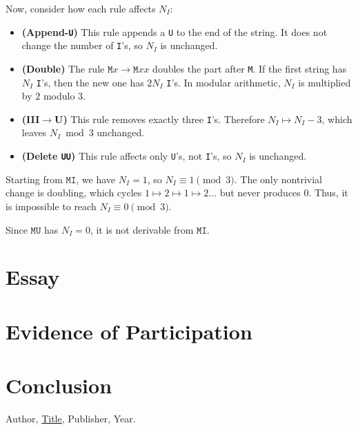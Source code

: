 \documentclass{article}
\theoremstyle{theorem}
\theoremstyle{definition}
\theoremstyle{remark}
\begin{document}
Now, consider how each rule affects $N_I$:
\begin{itemize}
  \item \textbf{(Append-\texttt{U})} This rule appends a \texttt{U} to the end of the 
  string. It does not change the number of \texttt{I}'s, so $N_I$ is unchanged.
  
  \item \textbf{(Double)} The rule $\texttt{M}x \to \texttt{M}xx$ doubles the part 
  after \texttt{M}. If the first string has $N_I$ \texttt{I}'s, then the new one has 
  $2N_I$ \texttt{I}'s. In modular arithmetic, $N_I$ is multiplied by $2$ modulo $3$.
  
  \item \textbf{(III$\to$U)} This rule removes exactly three \texttt{I}'s. Therefore 
  $N_I \mapsto N_I - 3$, which leaves $N_I \bmod 3$ unchanged.
  
  \item \textbf{(Delete \texttt{UU})} This rule affects only \texttt{U}'s, not 
  \texttt{I}'s, so $N_I$ is unchanged.
\end{itemize}

Starting from $\texttt{MI}$, we have $N_I=1$, so $N_I \equiv 1 \pmod{3}$. 
The only nontrivial change is doubling, which cycles $1 \mapsto 2 \mapsto 1 \mapsto 2 \dots$ 
but never produces $0$. Thus, it is impossible to reach $N_I \equiv 0 \pmod{3}$.

Since $\texttt{MU}$ has $N_I=0$, it is not derivable from $\texttt{MI}$.

\section{Essay}

\section{Evidence of Participation}

\section{Conclusion}\label{conclusion}

\begin{thebibliography}{99}
 Author, \href{https://en.wikipedia.org/wiki/LaTeX}{Title}, Publisher, Year.
\end{thebibliography}
\end{document}
